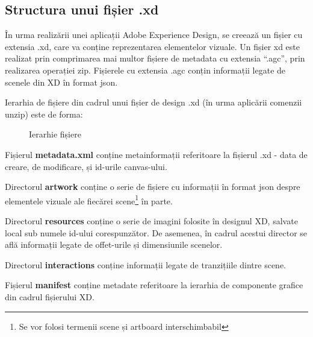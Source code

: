 \subsection{Structura unui fișier .xd}

În urma realizării unei aplicații Adobe Experience Design, se creează un fișier cu extensia .xd, care va conține reprezentarea elementelor vizuale. 
Un fișier xd este realizat prin comprimarea mai multor fișiere de metadata cu extensia “.agc”, prin realizarea operației zip. Fișierele cu extensia .agc conțin informații legate de scenele din XD în format json.

Ierarhia de fișiere din cadrul unui fișier de design .xd (în urma aplicării comenzii unzip) este de forma:

\begin{figure}[!htbp]
\caption{Ierarhie fișiere} \label{fig:ierarhie}
\end{figure}

Fișierul \textbf{metadata.xml} conține metainformații referitoare la fișierul .xd - data de creare, de modificare, și id-urile canvas-ului.

Directorul \textbf{artwork} conține o serie de fișiere cu informații în format json despre elementele vizuale ale fiecărei scene\footnote{Se vor folosi termenii scene și artboard interschimbabil} în parte. 

Directorul  \textbf{resources} conține o serie de imagini folosite în designul XD, salvate local sub numele id-ului corespunzător. De asemenea, în cadrul acestui director se află informații legate de offet-urile și dimensiunile scenelor.

Directorul \textbf{interactions} conține informații legate de tranzițiile dintre scene.

Fișierul \textbf{manifest} conține metadate referitoare la ierarhia de componente grafice din cadrul fișierului XD. 

